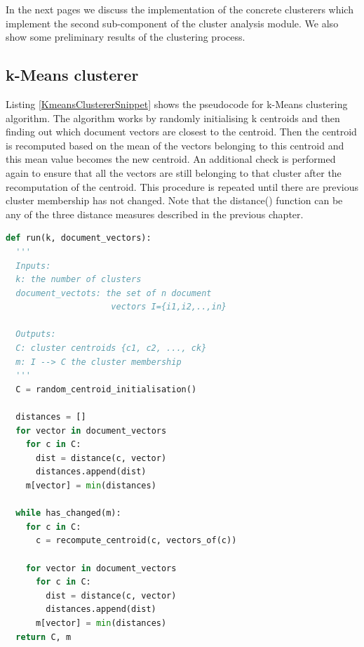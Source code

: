 In the next pages we discuss the implementation of the concrete clusterers which implement the second sub-component of the cluster analysis module. We also show some preliminary results of the clustering process.\\

\subsection{k-Means clusterer}
Listing \ref{KmeansClustererSnippet} shows the pseudocode for k-Means clustering algorithm. The algorithm works by randomly initialising k centroids and then finding out which document vectors are closest to the centroid. Then the centroid is recomputed based on the mean of the vectors belonging to this centroid and this mean value becomes the new centroid. An additional check is performed again to ensure that all the vectors are still belonging to that cluster after the recomputation of the centroid. This procedure is repeated until there are previous cluster membership has not changed. Note that the distance() function can be any of the three distance measures described in the previous chapter.

\begin{lstlisting}[language=Python, label=KmeansClustererSnippet, caption=Pseudocode for k-Means algorithm]
def run(k, document_vectors):
  '''
  Inputs: 
  k: the number of clusters
  document_vectots: the set of n document 
                     vectors I={i1,i2,..,in}
  
  Outputs:
  C: cluster centroids {c1, c2, ..., ck}
  m: I --> C the cluster membership
  '''
  C = random_centroid_initialisation()
  
  distances = []
  for vector in document_vectors
    for c in C:
      dist = distance(c, vector)
      distances.append(dist)
    m[vector] = min(distances)

  while has_changed(m):
    for c in C:
      c = recompute_centroid(c, vectors_of(c))   
    
    for vector in document_vectors
      for c in C:
        dist = distance(c, vector)  
        distances.append(dist)
      m[vector] = min(distances)
  return C, m

\end{lstlisting}
